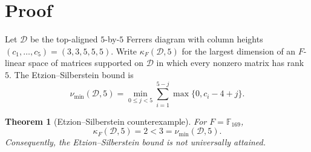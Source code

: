 \documentclass[11pt,reqno]{amsart}
\date{August 9, 2026}
\numberwithin{equation}{section}
\newtheorem{theorem}{Theorem}[section]
\begin{document}
\section{Proof}

Let $\mathcal D$ be the top-aligned $5$-by-$5$ Ferrers diagram with column
heights $(c_1,\ldots,c_5)=(3,3,5,5,5)$.  Write
$\kappa_F(\mathcal D,5)$ for the largest dimension of an $F$-linear space
of matrices supported on $\mathcal D$ in which every nonzero matrix has
rank $5$.  The Etzion--Silberstein bound is
\begin{equation}
 \nu_{\min}(\mathcal D,5)
 =\min_{0\le j<5}\sum_{i=1}^{5-j}
   \max\{0,c_i-4+j\}.
 \label{eq:bound}
\end{equation}

\begin{theorem}[Etzion--Silberstein counterexample]
For $F=\mathbb F_{169}$,
\[
 \kappa_F(\mathcal D,5)=2<3=\nu_{\min}(\mathcal D,5).
\]
Consequently, the Etzion--Silberstein bound is not universally attained.
\end{theorem}
\end{document}
